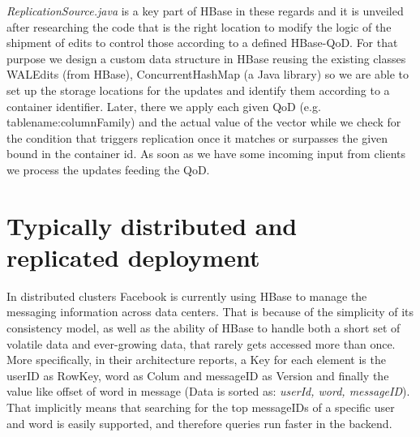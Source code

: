 \emph{ReplicationSource.java} is a key part of HBase in these regards and it is unveiled after researching the code that is the right location to modify the logic of the shipment of edits to control those according to a defined HBase-QoD. For that purpose we design a custom data structure in HBase reusing the existing classes WALEdits (from HBase), ConcurrentHashMap (a Java library) so we are able to set up the storage locations for the updates and identify them according to a container identifier. Later, there we apply each given QoD (e.g. tablename:columnFamily) and the actual value of the vector while we check for the condition that triggers replication once it matches or surpasses the given bound in the container id. As soon as we have some incoming input from clients we process the updates feeding the QoD.

\section{Typically distributed and replicated deployment}\label{distributed-architecture}
In distributed clusters Facebook is currently using HBase to manage the messaging information across data centers. That is because of the simplicity of its consistency model, as well as the ability of HBase to handle both a short set of volatile data and ever-growing data, that rarely gets accessed more than once. More specifically, in their architecture reports, a Key for each element is the userID as RowKey, word as Colum and messageID as Version and finally the value like offset of word in message (Data is sorted as: \emph{userId, word, messageID}). That implicitly means that searching for the top messageIDs of a specific user and word is easily supported, and therefore queries run faster in the backend.

